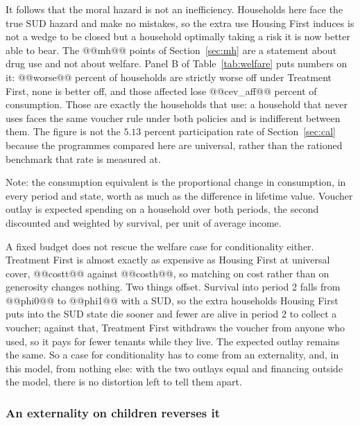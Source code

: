\documentclass[10pt]{article}
\newcommand{\notes}[2]{\par\vspace{0.4em}%
  \begin{minipage}{#1}\footnotesize #2\end{minipage}}
\newcommand{\tabnote}[1]{\notes{\wd\ntbox}{#1}}
\begin{document}
It follows that the moral hazard is not an inefficiency. Households here face the
true SUD hazard and make no mistakes, so the extra use Housing First
induces is not a wedge to be closed but a household optimally taking a risk it
is now better able to bear. The @@mh@@ points of Section~\ref{sec:mh} are a
statement about drug use and not about welfare. Panel B of
Table~\ref{tab:welfare} puts numbers on it: @@worse@@ percent of households are
strictly worse off under Treatment First, none is better off, and those affected
lose @@cev_aff@@ percent of consumption. Those are exactly the households
that use: a household that never uses faces the same voucher rule under both
policies and is indifferent between them. The figure is not the $5.13$
percent participation rate of Section~\ref{sec:cal} because the programmes
compared here are universal, rather than the rationed benchmark that rate is
measured at.

\begin{table}[!tb]
\centering
\caption{Welfare at universal cover, with no externality}\label{tab:welfare}
\sbox{\ntbox}{}\usebox{\ntbox}
\tabnote{Note: the consumption equivalent is the proportional change
in consumption, in every period and state, worth as much as the difference in
lifetime value. Voucher outlay is expected spending on a household over both
periods, the second discounted and weighted by survival, per unit of average
income.}
\end{table}

A fixed budget does not rescue the welfare case for conditionality either.
Treatment First is
almost exactly as expensive as Housing First at universal cover, @@costt@@ against
@@costh@@, so matching on cost rather than on generosity changes nothing. Two
things offset. Survival into period 2 falls from @@phi0@@ to @@phi1@@ with a SUD,
so the extra households Housing First puts into the SUD state die sooner and
fewer are alive in period 2 to collect a voucher; against that, Treatment First
withdraws the voucher from anyone who used, so it pays for fewer tenants while
they live. The expected outlay remains the same. So a case for conditionality has to come
from an externality, and, in this model, from nothing else: with the
two outlays equal and financing outside the model, there is no distortion left to
tell them apart.

\subsubsection{An externality on children reverses it}\label{sec:kids}
\end{document}

